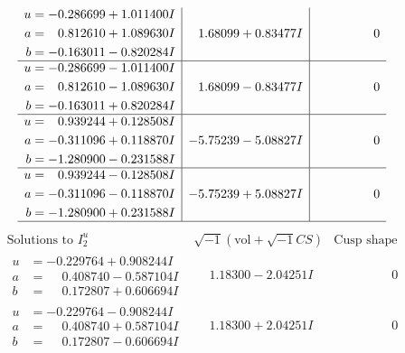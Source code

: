 \documentclass[1p]{elsarticle_modified}
\theoremstyle{definition}
\newcommand{\I}{\sqrt{-1}}
\begin{document}
$$\begin{array}{c|c|c}
\begin{aligned}
u &= -0.286699 + 1.011400 I \\
a &= \phantom{-}0.812610 + 1.089630 I \\
b &= -0.163011 - 0.820284 I\end{aligned}
 & \phantom{-}1.68099 + 0.83477 I & \phantom{-0.000000 } 0 \\ \hline\begin{aligned}
u &= -0.286699 - 1.011400 I \\
a &= \phantom{-}0.812610 - 1.089630 I \\
b &= -0.163011 + 0.820284 I\end{aligned}
 & \phantom{-}1.68099 - 0.83477 I & \phantom{-0.000000 } 0 \\ \hline\begin{aligned}
u &= \phantom{-}0.939244 + 0.128508 I \\
a &= -0.311096 + 0.118870 I \\
b &= -1.280900 - 0.231588 I\end{aligned}
 & -5.75239 - 5.08827 I & \phantom{-0.000000 } 0 \\ \hline\begin{aligned}
u &= \phantom{-}0.939244 - 0.128508 I \\
a &= -0.311096 - 0.118870 I \\
b &= -1.280900 + 0.231588 I\end{aligned}
 & -5.75239 + 5.08827 I & \phantom{-0.000000 } 0\\
 \hline 
 \end{array}$$\newpage$$\begin{array}{c|c|c}  
\text{Solutions to }I^u_{2}& \I (\text{vol} + \sqrt{-1}CS) & \text{Cusp shape}\\
 \hline 
\begin{aligned}
u &= -0.229764 + 0.908244 I \\
a &= \phantom{-}0.408740 - 0.587104 I \\
b &= \phantom{-}0.172807 + 0.606694 I\end{aligned}
 & \phantom{-}1.18300 - 2.04251 I & \phantom{-0.000000 } 0 \\ \hline\begin{aligned}
u &= -0.229764 - 0.908244 I \\
a &= \phantom{-}0.408740 + 0.587104 I \\
b &= \phantom{-}0.172807 - 0.606694 I\end{aligned}
 & \phantom{-}1.18300 + 2.04251 I & \phantom{-0.000000 } 0 \\ \hline\begin{aligned}

\end{aligned}
\end{array}$$
\end{document}
